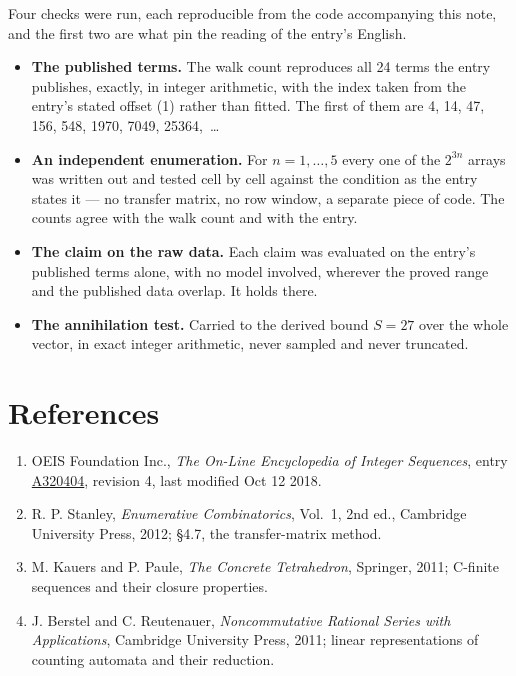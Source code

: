 \documentclass[11pt]{article}
\theoremstyle{definition}
\begin{document}
Four checks were run, each reproducible from the code accompanying this note, and the first two are what pin the reading of the entry's English.

\begin{itemize}

\item {\bfseries The published terms.} The walk count reproduces all 24 terms the entry publishes, exactly, in integer arithmetic, with the index taken from the entry's stated offset (1) rather than fitted. The first of them are 4, 14, 47, 156, 548, 1970, 7049, 25364,~\dots

\item {\bfseries An independent enumeration.} For $n = 1,\dots,5$ every one of the $2^{3n}$ arrays was written out and tested cell by cell against the condition as the entry states it --- no transfer matrix, no row window, a separate piece of code. The counts agree with the walk count and with the entry.

\item {\bfseries The claim on the raw data.} Each claim was evaluated on the entry's published terms alone, with no model involved, wherever the proved range and the published data overlap. It holds there.

\item {\bfseries The annihilation test.} Carried to the derived bound $S = 27$ over the whole vector, in exact integer arithmetic, never sampled and never truncated.

\end{itemize}

\section{References}

\begin{enumerate}

\item OEIS Foundation Inc., \emph{The On-Line Encyclopedia of Integer Sequences}, entry \href{https://oeis.org/A320404}{A320404}, revision 4, last modified Oct 12 2018.

\item R. P. Stanley, \emph{Enumerative Combinatorics}, Vol.~1, 2nd ed., Cambridge University Press, 2012; \S4.7, the transfer-matrix method.

\item M. Kauers and P. Paule, \emph{The Concrete Tetrahedron}, Springer, 2011; C-finite sequences and their closure properties.

\item J. Berstel and C. Reutenauer, \emph{Noncommutative Rational Series with Applications}, Cambridge University Press, 2011; linear representations of counting automata and their reduction.

\end{enumerate}
\end{document}
